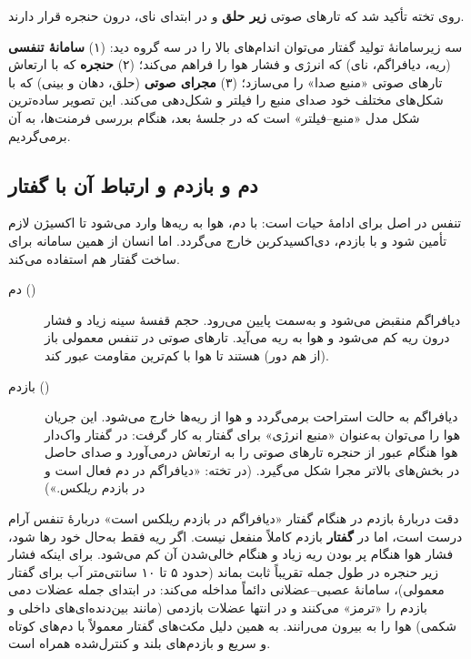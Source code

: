 روی تخته تأکید شد که تارهای صوتی \textbf{زیر حلق} و در ابتدای نای، درون حنجره قرار دارند.

\begin{addedbox}{سه زیرسامانهٔ تولید گفتار}
می‌توان اندام‌های بالا را در سه گروه دید: (۱) \textbf{سامانهٔ تنفسی} (ریه، دیافراگم، نای) که انرژی و فشار هوا را فراهم می‌کند؛ (۲) \textbf{حنجره} که با ارتعاش تارهای صوتی «منبع صدا» را می‌سازد؛ (۳) \textbf{مجرای صوتی} (حلق، دهان و بینی) که با شکل‌های مختلف خود صدای منبع را فیلتر و شکل‌دهی می‌کند. این تصویر ساده‌ترین شکل مدل «منبع–فیلتر» است که در جلسهٔ بعد، هنگام بررسی فرمنت‌ها، به آن برمی‌گردیم.
\end{addedbox}

\subsection{دم و بازدم و ارتباط آن با گفتار}
تنفس در اصل برای ادامهٔ حیات است: با دم، هوا به ریه‌ها وارد می‌شود تا اکسیژن لازم تأمین شود و با بازدم، دی‌اکسیدکربن خارج می‌گردد. اما انسان از همین سامانه برای ساخت گفتار هم استفاده می‌کند.
\begin{description}
  \item[دم ()] دیافراگم منقبض می‌شود و به‌سمت پایین می‌رود. حجم قفسهٔ سینه زیاد و فشار درون ریه کم می‌شود و هوا به ریه می‌آید. تارهای صوتی در تنفس معمولی باز (از هم دور) هستند تا هوا با کم‌ترین مقاومت عبور کند.
  \item[بازدم ()] دیافراگم به حالت استراحت برمی‌گردد و هوا از ریه‌ها خارج می‌شود. این جریان هوا را می‌توان به‌عنوان «منبع انرژی» برای گفتار به کار گرفت: در گفتار واک‌دار هوا هنگام عبور از حنجره تارهای صوتی را به ارتعاش درمی‌آورد و صدای حاصل در بخش‌های بالاتر مجرا شکل می‌گیرد. (در تخته: «دیافراگم در دم فعال است و در بازدم ریلکس.»)
\end{description}

\begin{correctionbox}{دقت دربارهٔ بازدم در هنگام گفتار}
«دیافراگم در بازدم ریلکس است» دربارهٔ تنفس آرام درست است، اما در \textbf{گفتار} بازدم کاملاً منفعل نیست. اگر ریه فقط به‌حال خود رها شود، فشار هوا هنگام پر بودن ریه زیاد و هنگام خالی‌شدن آن کم می‌شود. برای اینکه فشار زیر حنجره در طول جمله تقریباً ثابت بماند (حدود ۵ تا ۱۰ سانتی‌متر آب برای گفتار معمولی)، سامانهٔ عصبی–عضلانی دائماً مداخله می‌کند: در ابتدای جمله عضلات دمی بازدم را «ترمز» می‌کنند و در انتها عضلات بازدمی (مانند بین‌دنده‌ای‌های داخلی و شکمی) هوا را به بیرون می‌رانند. به همین دلیل مکث‌های گفتار معمولاً با دم‌های کوتاه و سریع و بازدم‌های بلند و کنترل‌شده همراه است.
\end{correctionbox}

